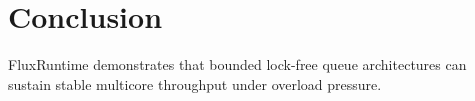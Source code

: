 \section{Conclusion}

FluxRuntime demonstrates that bounded lock-free queue architectures can sustain stable multicore throughput under overload pressure.
